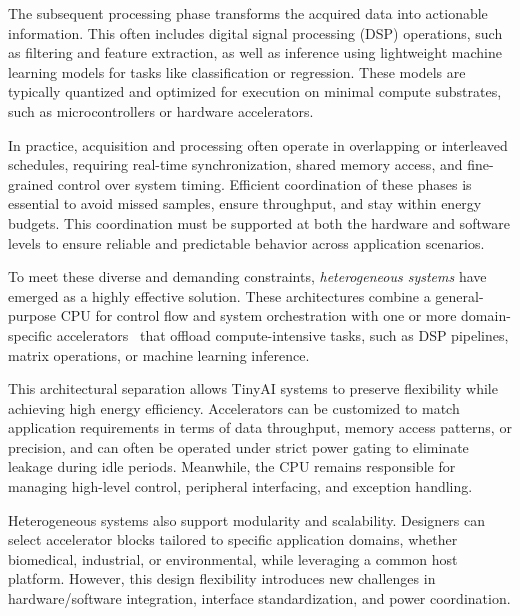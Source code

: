         The subsequent processing phase transforms the acquired data into actionable information. This often includes digital signal processing (DSP) operations, such as filtering and feature extraction, as well as inference using lightweight machine learning models for tasks like classification or regression. These models are typically quantized and optimized for execution on minimal compute substrates, such as microcontrollers or hardware accelerators. 

        In practice, acquisition and processing often operate in overlapping or interleaved schedules, requiring real-time synchronization, shared memory access, and fine-grained control over system timing. Efficient coordination of these phases is essential to avoid missed samples, ensure throughput, and stay within energy budgets. This coordination must be supported at both the hardware and software levels to ensure reliable and predictable behavior across application scenarios.

        To meet these diverse and demanding constraints, \emph{heterogeneous systems} have emerged as a highly effective solution. These architectures combine a general-purpose CPU for control flow and system orchestration with one or more domain-specific accelerators~\cite{e-gpu, asip, oe-cgra, blade} that offload compute-intensive tasks, such as DSP pipelines, matrix operations, or machine learning inference.

        This architectural separation allows TinyAI systems to preserve flexibility while achieving high energy efficiency. Accelerators can be customized to match application requirements in terms of data throughput, memory access patterns, or precision, and can often be operated under strict power gating to eliminate leakage during idle periods. Meanwhile, the CPU remains responsible for managing high-level control, peripheral interfacing, and exception handling.

        Heterogeneous systems also support modularity and scalability. Designers can select accelerator blocks tailored to specific application domains, whether biomedical, industrial, or environmental, while leveraging a common host platform. However, this design flexibility introduces new challenges in hardware/software integration, interface standardization, and power coordination.

